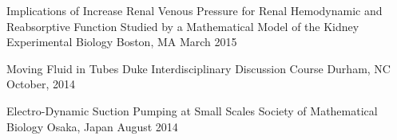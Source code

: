 \begin{cventries}
     \cventry
    {Implications of Increase Renal Venous Pressure for Renal Hemodynamic and Reabsorptive Function Studied by a Mathematical Model of the Kidney} %
    {Experimental Biology} %
    {Boston, MA} %
    {March 2015} %
    {
    }

    \cventry
    {Moving Fluid in Tubes} %
    {Duke Interdisciplinary Discussion Course} %
    {Durham, NC} %
    {October, 2014} %
    {
    }

    \cventry
    {Electro-Dynamic Suction Pumping at Small Scales} %
    {Society of Mathematical Biology} %
    {Osaka, Japan} %
    {August 2014} %
    {
    }



\end{cventries}
